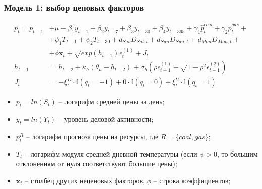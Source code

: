 \documentclass[c, dvipsnames]{beamer}  %
\begin{document}
\begin{frame}[shrink=5]
\frametitle{Модель 1: выбор ценовых факторов} 
\begin{align*}
p_{t} = p_{ t-1} & + \mu + \beta_1 y_{t-1} + \beta_2 y_{t-7} + \beta_3 y_{t-30} +  \beta_4 y_{t-365} + \gamma_1 \hat{p}^{coal}_t +  \gamma_2 \hat{p}^{gas}_t  +  \\ &  +  \psi_1 T_{ t-1 } + \psi_2 T_{ t-30 } +  d_{ Sat} D_{ Sat,t} + d_{ Sun }D_{ Sun,t} + d_{ Mon }D_{ Mon,t} +  \\ & + \phi \mathbf{x}_t + \sqrt{exp(h_{ t-1} )}\epsilon_{ t }^{(1)}+ J _{t }\\
h_{t-1} &= h_{ t-2} + \kappa_{ h} (\theta_{ h} - h_{ t-2} ) + \sigma_{ h} (\rho \epsilon_{ t-1}^{(1)} + \sqrt{1 - \rho^2} \epsilon_{ t-1}^{(2)}) \\
J_{ t} &= -\xi_{ t}^D \cdot \mathbb{I}(q_{ t} = -1) + 0 \cdot \mathbb{I} (q_{ t} = 0) + \xi_{ t}^U \cdot \mathbb{I} (q_{ t} = 1)
\end{align*}
\footnotesize{
	\begin{itemize}
		\item $p_{ t} = ln(S_{ t})$ --  логарифм средней цены за день;
		\item  $y_{ t} = ln(Y_{ t})$ --  уровень деловой активности;   %
		\item  $p^R_t$ -- логарифм прогноза цены на ресурсы, где $R = \{ coal, gas\}$; %
		\item  $T_{ t}$ -- логарифм модуля средней дневной температуры (если  $\psi>0$, то большим отклонениям от нуля соответствуют большие цены);
		
		
		
		\item  $\mathbf{x}_t$  -- столбец других неценовых факторов, $\phi$ -- строка коэффициентов;
	

\end{itemize}}
\end{frame}
\end{document}
